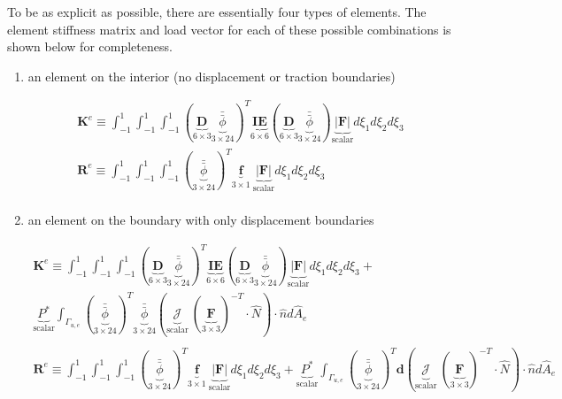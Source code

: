 \documentclass[10pt]{article}
\begin{document}
To be as explicit as possible, there are essentially four types of elements. The element stiffness matrix and load vector for each of these possible combinations is shown below for completeness.

\begin{enumerate}
\item an element on the interior (no displacement or traction boundaries)

\begin{equation}
\begin{aligned}
\textbf{K}^e\equiv\int_{-1}^{1}\int_{-1}^{1}\int_{-1}^{1}(\underbrace{\textbf{D}}_{6\times3}\underbrace{\bar{\bar{\phi}}}_{3\times24})^T\underbrace{\textbf{IE}}_{6\times6}(\underbrace{\textbf{D}}_{6\times3}\underbrace{\bar{\bar{\phi}}}_{3\times24})\underbrace{|\textbf{F}|}_\text{scalar}d\xi_1d\xi_2d\xi_3\\
\textbf{R}^e\equiv\int_{-1}^{1}\int_{-1}^{1}\int_{-1}^{1}(\underbrace{\bar{\bar{\phi}}}_{3\times24})^T\underbrace{\textbf{f}}_{3\times1}\ \underbrace{|\textbf{F}|}_\text{scalar}d\xi_1d\xi_2d\xi_3\\
\end{aligned}
\end{equation}

\item an element on the boundary with only displacement boundaries

\begin{equation}
\begin{aligned}
\textbf{K}^e\equiv\int_{-1}^{1}\int_{-1}^{1}\int_{-1}^{1}(\underbrace{\textbf{D}}_{6\times3}\underbrace{\bar{\bar{\phi}}}_{3\times24})^T\underbrace{\textbf{IE}}_{6\times6}(\underbrace{\textbf{D}}_{6\times3}\underbrace{\bar{\bar{\phi}}}_{3\times24})\underbrace{|\textbf{F}|}_\text{scalar}d\xi_1d\xi_2d\xi_3 +\quad\\
\underbrace{P^{*}}_\text{scalar}\int_{\Gamma_{u,e}}(\underbrace{\bar{\bar{\phi}}}_{3\times24})^T\underbrace{\bar{\bar{\phi}}}_{3\times24}(\underbrace{\mathscr{J}}_\text{scalar}\ (\underbrace{\textbf{F}}_{3\times3})^{-T}\cdot\hat{N})\cdot\hat{n}d\hat{A}_e\\
\ \\
\textbf{R}^e\equiv\int_{-1}^{1}\int_{-1}^{1}\int_{-1}^{1}(\underbrace{\bar{\bar{\phi}}}_{3\times24})^T\underbrace{\textbf{f}}_{3\times1}\ \underbrace{|\textbf{F}|}_\text{scalar}d\xi_1d\xi_2d\xi_3+\underbrace{P^{*}}_\text{scalar}\int_{\Gamma_{u,e}}(\underbrace{\bar{\bar{\phi}}}_{3\times24})^T\textbf{d}(\underbrace{\mathscr{J}}_\text{scalar}\ (\underbrace{\textbf{F}}_{3\times3})^{-T}\cdot\hat{N})\cdot\hat{n}d\hat{A}_e\\
\end{aligned}
\end{equation}


\end{enumerate}
\end{document}
